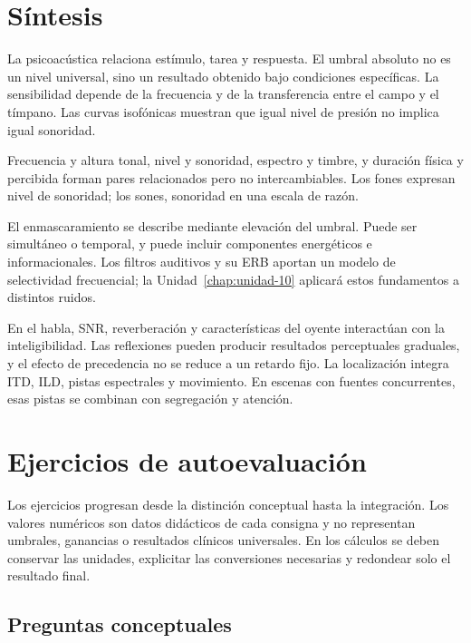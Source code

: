 \section{Síntesis}
\label{sec:u7-sintesis}

La psicoacústica relaciona estímulo, tarea y respuesta. El umbral absoluto no
es un nivel universal, sino un resultado obtenido bajo condiciones
específicas. La sensibilidad depende de la frecuencia y de la transferencia
entre el campo y el tímpano. Las curvas isofónicas muestran que igual nivel de
presión no implica igual sonoridad.

Frecuencia y altura tonal, nivel y sonoridad, espectro y timbre, y duración
física y percibida forman pares relacionados pero no intercambiables. Los
fones expresan nivel de sonoridad; los sones, sonoridad en una escala de razón.

El enmascaramiento se describe mediante elevación del umbral. Puede ser
simultáneo o temporal, y puede incluir componentes energéticos e
informacionales. Los filtros auditivos y su ERB aportan un modelo de
selectividad frecuencial; la Unidad~\ref{chap:unidad-10} aplicará estos fundamentos a distintos
ruidos.

En el habla, SNR, reverberación y características del oyente interactúan con la
inteligibilidad. Las reflexiones pueden producir resultados perceptuales
graduales, y el efecto de precedencia no se reduce a un retardo fijo. La
localización integra ITD, ILD, pistas espectrales y movimiento. En escenas con
fuentes concurrentes, esas pistas se combinan con segregación y atención.

\section{Ejercicios de autoevaluación}
\label{sec:u7-ejercicios}

Los ejercicios progresan desde la distinción conceptual hasta la integración.
Los valores numéricos son datos didácticos de cada consigna y no representan
umbrales, ganancias o resultados clínicos universales. En los cálculos se
deben conservar las unidades, explicitar las conversiones necesarias y
redondear solo el resultado final.

\subsection*{Preguntas conceptuales}

